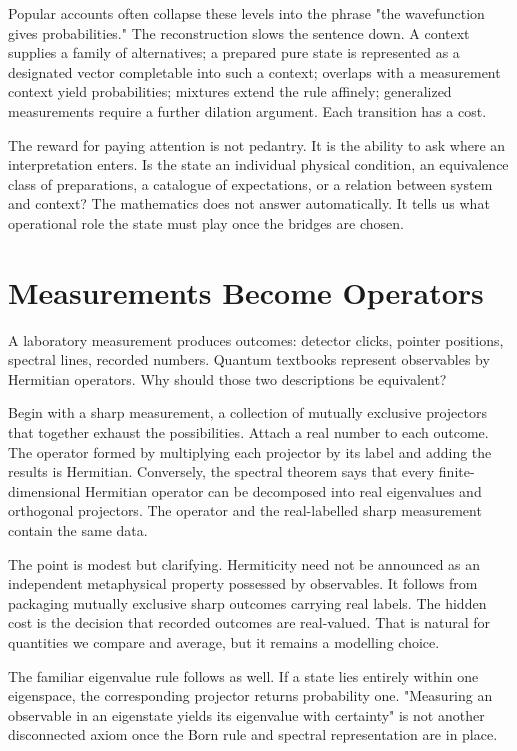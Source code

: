 \documentclass[12pt,openany]{book}
\begin{document}
Popular accounts often collapse these levels into the phrase "the wavefunction gives probabilities." The reconstruction slows the sentence down. A context supplies a family of alternatives; a prepared pure state is represented as a designated vector completable into such a context; overlaps with a measurement context yield probabilities; mixtures extend the rule affinely; generalized measurements require a further dilation argument. Each transition has a cost.

The reward for paying attention is not pedantry. It is the ability to ask where an interpretation enters. Is the state an individual physical condition, an equivalence class of preparations, a catalogue of expectations, or a relation between system and context? The mathematics does not answer automatically. It tells us what operational role the state must play once the bridges are chosen.

\chapter{Measurements Become Operators}
A laboratory measurement produces outcomes: detector clicks, pointer positions, spectral lines, recorded numbers. Quantum textbooks represent observables by Hermitian operators. Why should those two descriptions be equivalent?

Begin with a sharp measurement, a collection of mutually exclusive projectors that together exhaust the possibilities. Attach a real number to each outcome. The operator formed by multiplying each projector by its label and adding the results is Hermitian. Conversely, the spectral theorem says that every finite-dimensional Hermitian operator can be decomposed into real eigenvalues and orthogonal projectors. The operator and the real-labelled sharp measurement contain the same data.

The point is modest but clarifying. Hermiticity need not be announced as an independent metaphysical property possessed by observables. It follows from packaging mutually exclusive sharp outcomes carrying real labels. The hidden cost is the decision that recorded outcomes are real-valued. That is natural for quantities we compare and average, but it remains a modelling choice.

The familiar eigenvalue rule follows as well. If a state lies entirely within one eigenspace, the corresponding projector returns probability one. "Measuring an observable in an eigenstate yields its eigenvalue with certainty" is not another disconnected axiom once the Born rule and spectral representation are in place.
\end{document}
